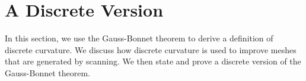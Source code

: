 \section{A Discrete Version}
\label{sec:discrete}

In this section, we use the Gauss-Bonnet theorem to derive
a definition of discrete curvature. We discuss how discrete curvature
is used to improve meshes that are generated by scanning.
We then state and prove a discrete version of the Gauss-Bonnet theorem.



